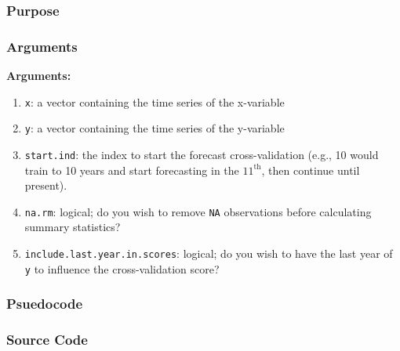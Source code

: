 \documentclass[12pt,]{book}
\providecommand{\tightlist}{%
  \setlength{\itemsep}{0pt}\setlength{\parskip}{0pt}}
\theoremstyle{definition}
\theoremstyle{definition}
\theoremstyle{definition}
\theoremstyle{remark}
\begin{document}
\subsubsection*{Purpose}\label{purpose}

\subsubsection*{Arguments}\label{arguments}

\noindent
\textbf{Arguments:}

\begin{enumerate}
\def\labelenumi{\arabic{enumi}.}
\tightlist
\item
  \texttt{x}: a vector containing the time series of the x-variable
\item
  \texttt{y}: a vector containing the time series of the y-variable
\item
  \texttt{start.ind}: the index to start the forecast cross-validation
  (e.g., 10 would train to 10 years and start forecasting in the
  \(11^{\text{th}}\), then continue until present).
\item
  \texttt{na.rm}: logical; do you wish to remove \texttt{NA}
  observations before calculating summary statistics?
\item
  \texttt{include.last.year.in.scores}: logical; do you wish to have the
  last year of \texttt{y} to influence the cross-validation score?
\end{enumerate}

\subsubsection*{Psuedocode}\label{psuedocode}

\subsubsection*{Source Code}\label{source-code}
\end{document}
